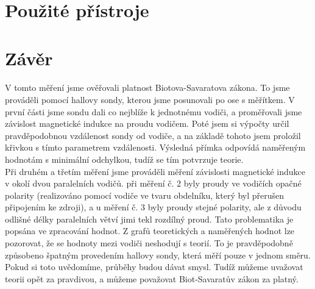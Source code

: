 \documentclass{praktikum}
\begin{document}
\section{Použité přístroje}
\begin{table}[H]
\centering
{}
\caption{Použité měřící přístroje}
\label{tab:my-tablosos}
\end{table}

\section{Závěr}
\paragraph{}
V tomto měření jsme ověřovali platnost Biotova-Savaratova zákona. To jsme prováděli pomocí hallovy sondy, kterou jsme posunovali po ose s měřítkem. V první části jsme sondu dali co nejblíže k jednotnému vodiči, a proměřovali jsme závislost magnetické indukce na proudu vodičem. Poté jsem si výpočty určil pravděpodobnou vzdálenost sondy od vodiče, a na základě tohoto jsem proložil křivkou s tímto parametrem vzdálenosti. Výsledná přímka odpovídá naměřeným hodnotám s minimální odchylkou, tudíž se tím potvrzuje teorie. \\

\indent Při druhém a třetím měření jsme prováděli měření závislosti magnetické indukce v okolí dvou paralelních vodičů. při měření č. 2 byly proudy ve vodičích opačné polarity (realizováno pomocí vodiče ve tvaru obdelníku, který byl přerušen připojením ke zdroji), a u měření č. 3 byly proudy stejné polarity, ale z důvodu odlišné délky paralelních větví jimi tekl rozdílný proud. Tato problematika je popsána ve zpracování hodnot. Z grafů teoretických a naměřených hodnot lze pozorovat, že se hodnoty mezi vodiči neshodují s teorií. To je pravděpodobně způsobeno špatným provedením hallovy sondy, která měří pouze v jednom směru. Pokud si toto uvědomíme, průběhy budou dávat smysl. Tudíž můžeme uvažovat teorii opět za pravdivou, a můžeme považovat Biot-Savaratův zákon za platný.
\end{document}
